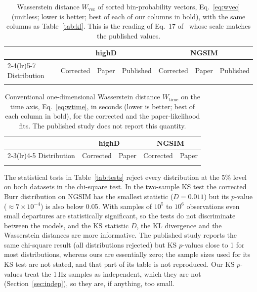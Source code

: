 \documentclass[11pt,a4paper]{article}
\numberwithin{equation}{section}
\newcommand{\Wvec}{W_{\mathrm{vec}}}
\newcommand{\Wtime}{W_{\mathrm{time}}}
\begin{document}
\begin{table}[H]
\centering\footnotesize
\setlength{\tabcolsep}{3.5pt}
\caption{Wasserstein distance $\Wvec$ of sorted bin-probability vectors, Eq.~\eqref{eq:wvec} (unitless; lower is better; best of each of our columns in bold), with the same columns as Table~\ref{tab:kl}. This is the reading of Eq.~17 of~\cite{leungbootnak} whose scale matches the published values.}
\label{tab:wvec}
\begin{tabular}{@{}lrrrrrr@{}}
\toprule
 & \multicolumn{3}{c}{highD} & \multicolumn{3}{c}{NGSIM} \\
\cmidrule(lr){2-4}\cmidrule(lr){5-7}
Distribution & Corrected & Paper & Published & Corrected & Paper & Published \\
\midrule
\\
\bottomrule
\end{tabular}
\end{table}

\begin{table}[H]
\centering\small
\caption{Conventional one-dimensional Wasserstein distance $\Wtime$ on the time axis, Eq.~\eqref{eq:wtime}, in seconds (lower is better; best of each column in bold), for the corrected and the paper-likelihood fits. The published study does not report this quantity.}
\label{tab:wtime}
\begin{tabular}{@{}lrrrr@{}}
\toprule
 & \multicolumn{2}{c}{highD} & \multicolumn{2}{c}{NGSIM} \\
\cmidrule(lr){2-3}\cmidrule(lr){4-5}
Distribution & Corrected & Paper & Corrected & Paper \\
\midrule
\\
\bottomrule
\end{tabular}
\end{table}

The statistical tests in Table~\ref{tab:tests} reject every distribution at the 5\% level on both datasets in the chi-square test. In the two-sample KS test the corrected Burr distribution on NGSIM has the smallest statistic ($D=0.011$) but its $p$-value ($\approx7\times10^{-4}$) is also below 0.05.
With samples of $10^5$ to $10^6$ observations even small departures are statistically significant, so the tests do not discriminate between the models, and the KS statistic $D$, the KL divergence and
the Wasserstein distances are more informative. The published study reports the same chi-square result (all distributions rejected) but KS $p$-values close to 1 for most distributions, whereas
ours are essentially zero; the sample sizes used for its KS test are not stated, and that part of its table is not reproduced. Our KS $p$-values treat the 1\,Hz samples as independent, which they are not (Section~\ref{sec:indep}), so they are, if anything, too small.
\end{document}
